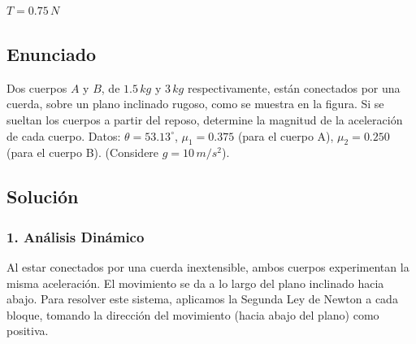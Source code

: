\documentclass[12pt, a4paper]{article}
\begin{document}
\begin{tcolorbox}[colback=green!5!white, colframe=green!50!black, title=Respuesta Final]
\centering \Large $T = 0.75 \, \si{N}$
\end{tcolorbox}

\newpage

\subsection*{Enunciado}
Dos cuerpos $A$ y $B$, de $1.5 \, \si{kg}$ y $3 \, \si{kg}$ respectivamente, están conectados por una cuerda, sobre un plano inclinado rugoso, como se muestra en la figura. Si se sueltan los cuerpos a partir del reposo, determine la magnitud de la aceleración de cada cuerpo.
Datos: $\theta = 53.13^\circ$, $\mu_1 = 0.375$ (para el cuerpo A), $\mu_2 = 0.250$ (para el cuerpo B). (Considere $g=10\,\si{m/s^2}$).

\begin{center}
\end{center}

\subsection*{Solución}

\subsubsection*{1. Análisis Dinámico}
Al estar conectados por una cuerda inextensible, ambos cuerpos experimentan la misma aceleración. El movimiento se da a lo largo del plano inclinado hacia abajo.
Para resolver este sistema, aplicamos la Segunda Ley de Newton a cada bloque, tomando la dirección del movimiento (hacia abajo del plano) como positiva.
\end{document}
